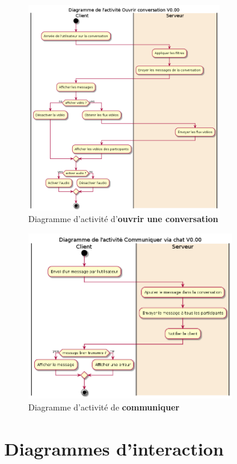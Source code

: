 \documentclass[11pt,dvipsnames,svgnames]{report}
\begin{document}
\begin{figure}[H]
\caption{Diagramme d'activité d'\textbf{ouvrir une conversation}}
\centerline{\includegraphics[width=0.75\textwidth]{diagrammes/activity-openConv-diag.png}}
\end{figure}

\begin{figure}[H]
\caption{Diagramme d'activité de \textbf{communiquer}}
\centerline{\includegraphics[width=0.8\textwidth]{diagrammes/activity-sendMsg-diag.png}}
\end{figure}

\section{Diagrammes d’interaction}
\end{document}
